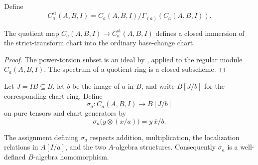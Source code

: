 \begin{definition}
  \label{def:nagata-strict-transform-chart-ring}

  Define
  \[
    C_a^{\mathrm{st}}(A,B,I)
      =C_a(A,B,I)/\Gamma_{(a)}(C_a(A,B,I)).
  \]
\end{definition}

\begin{lemma}
  \label{lemma:nagata-strict-transform-chart-closed}

  The quotient map
  $C_a(A,B,I)\to C_a^{\mathrm{st}}(A,B,I)$ defines a closed immersion of
  the strict-transform chart into the ordinary base-change chart.
\end{lemma}

\begin{proof}
  The power-torsion subset is an ideal by
  , applied to the regular module
  $C_a(A,B,I)$.  The spectrum of a quotient ring is a closed subscheme.
\end{proof}

\begin{definition}
  \label{def:nagata-strict-chart-to-extended-blowup-chart}

  Let $J=IB\subseteq B$, let $b$ be the image of $a$ in $B$, and write
  $B[J/b]$ for the corresponding chart ring.  Define
  \[
    \sigma_a\colon C_a(A,B,I)\longrightarrow B[J/b]
  \]
  on pure tensors and chart generators by
  \[
    \sigma_a\bigl(y\otimes(x/a)\bigr)=y\,\overline x/b.
  \]
\end{definition}

\begin{lemma}
  \label{lemma:nagata-strict-chart-to-extended-blowup-chart}

  The assignment defining $\sigma_a$ respects addition, multiplication, the
  localization relations in $A[I/a]$, and the two $A$-algebra structures.
  Consequently $\sigma_a$ is a well-defined $B$-algebra homomorphism.
\end{lemma}

